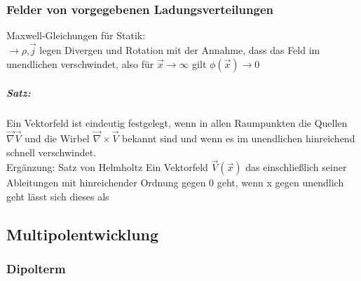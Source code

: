 \documentclass[a4paper]{article}
\begin{document}
\subsubsection{Felder von vorgegebenen Ladungsverteilungen}
Maxwell-Gleichungen für Statik:\\
$\rightarrow \rho$,$\vec{j}$ legen Divergen und Rotation mit der Annahme, dass
das Feld im unendlichen verschwindet, also für $\vec{x}\rightarrow\infty$ gilt
$\phi(\vec{x})\rightarrow0$
\subparagraph{Satz:}
Ein Vektorfeld ist eindeutig festgelegt, wenn in allen Raumpunkten die Quellen
$\vec{\nabla}\vec{V}$ und die Wirbel $\vec{\nabla}\times\vec{V}$ bekannt sind
und wenn es im unendlichen hinreichend schnell verschwindet.\\ 
Ergänzung: Satz von Helmholtz
Ein Vektorfeld $\vec{V}(\vec{x})$ das einschließlich seiner Ableitungen mit
hinreichender Ordnung gegen 0 geht, wenn x gegen unendlich geht lässt sich
dieses als 



\subsection{Multipolentwicklung}
\subsubsection{Dipolterm}
\end{document}
